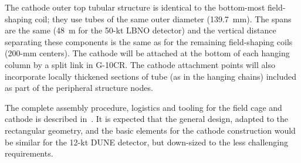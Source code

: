 The cathode outer top tubular structure is identical to the bottom-most
field-shaping coil; they use tubes of the same outer diameter
(139.7~mm).  The spans are the same (48~m for the 50-kt LBNO detector)
and the vertical distance separating these components is the same as
for the remaining field-shaping coils (200-mm centers). The cathode
will be attached at the bottom of each hanging column by a split link
in G-10CR. The cathode attachment points will also incorporate locally
thickened sections of tube (as in the hanging chains) included as part
of the peripheral structure nodes.
 
The complete assembly procedure, logistics and tooling for the field
cage and cathode is described in~\cite{cdr-annex-lbno-2}.  It is expected that the
general design, adapted to the rectangular geometry, and the basic
elements for the cathode construction would be similar for the 12-kt
DUNE detector, but down-sized to the less challenging requirements.
